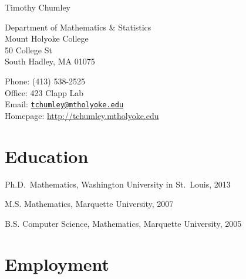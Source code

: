 \documentclass[10pt,letterpaper]{article}
\def\name{Timothy Chumley}
\renewenvironment{itemize}{
  \begin{list}{}{
    \setlength{\leftmargin}{1.5em}
    \setlength{\itemsep}{0.25em}
    \setlength{\parskip}{0pt}
    \setlength{\parsep}{0.25em}
  }
}{
  \end{list}
}
\providecommand{\tightlist}{%
  \setlength{\itemsep}{0pt}\setlength{\parskip}{0pt}}
\let\tightlist\relax
\begin{document}
{\huge \name}


\bigskip

\begin{minipage}[t]{0.495\textwidth}
  Department of Mathematics \& Statistics \\
  Mount Holyoke College \\
  50 College St \\
  South Hadley, MA 01075
\end{minipage}
\begin{minipage}[t]{0.495\textwidth}
  Phone: (413) 538-2525 \\
  Office: 423 Clapp Lab \\
  Email: \href{mailto:tchumley@mtholyoke.edu}{\tt tchumley@mtholyoke.edu} \\
  Homepage: \url{http://tchumley.mtholyoke.edu}
\end{minipage}

\hypertarget{education}{%
\section*{Education}\label{education}}

\begin{itemize}
\tightlist
\item
  Ph.D.~Mathematics, Washington University in St.~Louis, 2013
\item
  M.S. Mathematics, Marquette University, 2007
\item
  B.S. Computer Science, Mathematics, Marquette University, 2005
\end{itemize}

\hypertarget{employment}{%
\section*{Employment}\label{employment}}
\end{document}
